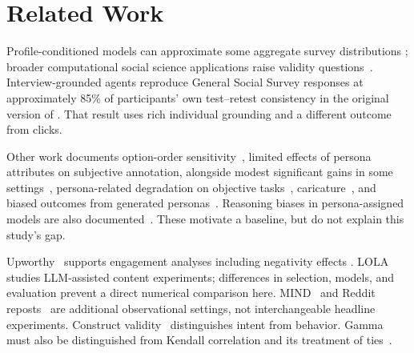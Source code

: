 \section{Related Work}
Profile-conditioned models can approximate some aggregate survey distributions
\citep{argyleSiliconSampling}; broader computational social science applications raise validity
questions~\citep{ziems2024css}. Interview-grounded agents reproduce General Social Survey responses
at approximately 85\% of participants' own test--retest consistency in the original version of
\citet{park2024agents}. That result uses rich individual grounding and a different outcome from clicks.

Other work documents option-order sensitivity~\citep{dominguezolmedo2024questioning}, limited effects
of persona attributes on subjective annotation, alongside modest significant gains in some
settings~\citep{hu2024persona}, persona-related degradation
on objective tasks~\citep{zheng2024helpful}, caricature~\citep{cheng2023compost}, and biased outcomes
from generated personas~\citep{li2025personacatch}. Reasoning biases in persona-assigned models are also documented~\citep{gupta2024bias}. These motivate a baseline, but do not explain
this study's gap.

Upworthy~\citep{matiasUpworthy} supports engagement analyses including negativity effects
\citep{robertson2023negativity}. LOLA~\citep{ye2024lola} studies LLM-assisted content experiments;
differences in selection, models, and evaluation prevent a direct numerical comparison here.
MIND~\citep{wu2020mind} and Reddit reposts~\citep{lakkaraju2013name} are additional observational
settings, not interchangeable headline experiments. Construct validity~\citep{cronbach1955construct}
distinguishes intent from behavior. Gamma~\citep{goodman1954} must also be distinguished from
Kendall correlation and its treatment of ties~\citep{kendall1938,kendall1945ties}.

